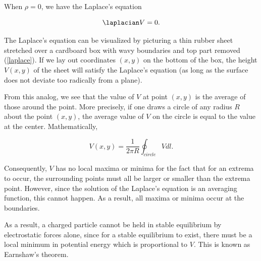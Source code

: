 \documentclass[english,a4paper,12pt]{report}
\begin{document}
When \(\rho = 0\), we have the Laplace's equation

\begin{equation}
    \laplacian V = 0.
\end{equation}
	
The Laplace's equation can be visualized by picturing a thin rubber sheet stretched over a cardboard box with wavy boundaries and top part removed (\cref{laplace}). If we lay out coordinates \((x,y)\) on the bottom of the box, the height \(V(x,y)\) of the sheet will satisfy the Laplace's equation (as long as the surface does not deviate too radically from a plane). 

	
From this analog, we see that the value of \(V\) at point \((x,y)\) is the average of those around the point. More precisely, if one draws a circle of any radius \(R\) about the point \((x,y)\), the average value of \(V\) on the circle is equal to the value at the center. Mathematically, 

\begin{equation}
    V(x,y) = \frac{1}{2\pi R} \oint _{circle} Vdl.
\end{equation}

Consequently, \(V\) has no local maxima or minima for the fact that for an extrema to occur, the surrounding points must all be larger or smaller than the extrema point. However, since the solution of the Laplace's equation is an averaging function, this cannot happen. As a result, all maxima or minima occur at the boundaries.

As a result, a charged particle cannot be held in stable equilibrium by electrostatic forces alone, since for a stable equilibrium to exist, there must be a local minimum in potential energy which is proportional to \(V\). This is known as Earnshaw's theorem.
\end{document}

